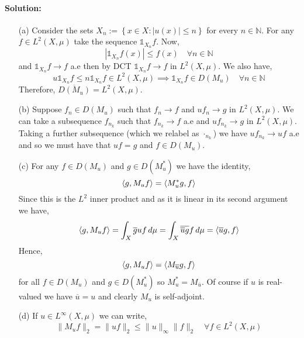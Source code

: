 \paragraph{Solution:}
\begin{itemize}
	\item [(a)]
		Consider the sets $X_{n}:=\left\{x\in X\colon |u(x)|\leq n\right\}$ for every $n\in\mathbb{N}$. For any $f\in L^{2}(X,\mu)$ take the sequence $\mathds{1}_{X_{n}}f$. Now,
		\begin{equation*}
			|\mathds{1}_{X_{n}}f(x)|\leq f(x) \quad \forall n\in\mathbb{N}
		\end{equation*}
		and $\mathds{1}_{X_{n}}f\to f$ a.e then by DCT $\mathds{1}_{X_{n}}f\to f$ in $L^{2}(X,\mu)$. We also have,
		\begin{equation*}
			u\mathds{1}_{X_{n}}f \leq n\mathds{1}_{X_{n}}f\in L^{2}(X,\mu)\implies \mathds{1}_{X_{n}}f\in D(M_{u}) \quad \forall n\in\mathbb{N}
		\end{equation*}
		Therefore, $\overline{D(M_{u})} = L^{2}(X,\mu)$.
	\item [(b)]
		Suppose $f_{n}\in D(M_{u})$ such that $f_{n}\to f$ and $uf_{n}\to g$ in $L^{2}(X,\mu)$. We can take a subsequence $f_{n_{k}}$ such that $f_{n_{k}}\to f$ a.e and $uf_{n_{k}}\to g$ in $L^{2}(X,\mu)$. Taking a further subsequence (which we relabel as $\cdot_{n_{k}}$) we have $uf_{n_{k}}\to uf$ a.e and so we must have that $uf = g$ and $f\in D(M_{u})$.
	\item [(c)]
		For any $f\in D(M_{u})$ and $g\in D(M_{u}^{*})$ we have the identity,
		\begin{equation*}
			\braket{g,M_{u}f} = \braket{M_{u}^{*}g,f}
		\end{equation*}
		Since this is the $L^{2}$ inner product and as it is linear in its second argument we have,
		\begin{equation*}
			\braket{g,M_{u}f} = \int_{X}\overline{g}uf\,d\mu = \int_{X}\overline{\overline{u}g}f\,d\mu = \braket{\overline{u}g,f}
		\end{equation*}
		Hence,
		\begin{equation*}
			\braket{g,M_{u}f} = \braket{M_{\overline{u}}g,f}
		\end{equation*}
		for all $f\in D(M_{u})$ and $g\in D(M_{u}^{*})$ so $M_{u}^{*} = M_{\overline{u}}$. Of course if $u$ is real-valued we have $\overline{u}=u$ and clearly $M_{u}$ is self-adjoint.
	\item [(d)]
		If $u\in L^{\infty}(X,\mu)$ we can write,
		\begin{equation*}
			\|M_{u}f\|_{2} = \|uf\|_{2}\leq \|u\|_{\infty}\|f\|_{2} \quad \forall f\in L^{2}(X,\mu)
		\end{equation*}
\end{itemize}

